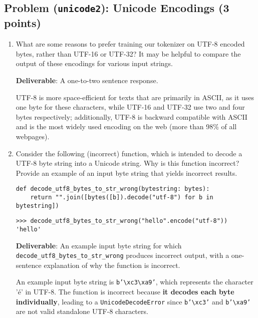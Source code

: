 \documentclass{article}
\newcounter{problem}
\newcommand{\problem}[2]{
    \stepcounter{problem}
    \subsection{Problem (\texttt{#1}): #2}
    \vspace{-2em} %
    \noindent
}
\begin{document}
\problem{unicode2}{Unicode Encodings (3 points)}

\begin{enumerate}[label=(\alph*)]
    \item {What are some reasons to prefer training our tokenizer on UTF-8 encoded bytes, rather than UTF-16 or UTF-32? It may be helpful to compare the output of these encodings for various input strings.}
    
    {\textbf{Deliverable}: A one-to-two sentence response.}
    
    \begin{answer}
    UTF-8 is more space-efficient for texts that are primarily in ASCII, as it uses one byte for these characters, while UTF-16 and UTF-32 use two and four bytes respectively; additionally, UTF-8 is backward compatible with ASCII and is the most widely used encoding on the web (more than 98\% of all webpages).
    \end{answer}
    
    \item {Consider the following (incorrect) function, which is intended to decode a UTF-8 byte string into a Unicode string. Why is this function incorrect? Provide an example of an input byte string that yields incorrect results.}
    
    \begin{lstlisting}
def decode_utf8_bytes_to_str_wrong(bytestring: bytes):
    return "".join([bytes([b]).decode("utf-8") for b in bytestring])
    \end{lstlisting}
    
    \begin{lstlisting}
>>> decode_utf8_bytes_to_str_wrong("hello".encode("utf-8"))
'hello'
    \end{lstlisting}
    
    {\textbf{Deliverable}: An example input byte string for which \texttt{decode\_utf8\_bytes\_to\_str\_wrong} produces incorrect output, with a one-sentence explanation of why the function is incorrect.}
    
    \begin{answer}
    An example input byte string is \texttt{b'\textbackslash xc3\textbackslash xa9'}, which represents the character 'é' in UTF-8. The function is incorrect because \textbf{it decodes each byte individually}, leading to a \texttt{UnicodeDecodeError} since \texttt{b'\textbackslash xc3'} and \texttt{b'\textbackslash xa9'} are not valid standalone UTF-8 characters.
    

\end{answer}
\end{enumerate}
\end{document}

